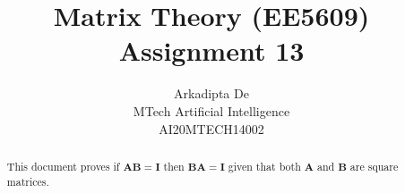 \documentclass[journal,12pt,twocolumn]{IEEEtran}
\DeclareMathOperator*{\Res}{Res}
\begin{document}
\providecommand{\abs}[1]{\left\vert#1\right\vert}
\providecommand{\res}[1]{\Res\displaylimits_{#1}} 
\providecommand{\norm}[1]{\left\lVert#1\right\rVert}
\providecommand{\mtx}[1]{\mathbf{#1}}
\providecommand{\mean}[1]{E\left[ #1 \right]}
\providecommand{\fourier}{\overset{\mathcal{F}}{ \rightleftharpoons}}
\providecommand{\system}{\overset{\mathcal{H}}{ \longleftrightarrow}}
\newcommand{\solution}{\noindent \textbf{Solution: }}
\newcommand{\cosec}{\,\text{cosec}\,}
\providecommand{\dec}[2]{\ensuremath{\overset{#1}{\underset{#2}{\gtrless}}}}
\newcommand{\myvec}[1]{\ensuremath{\begin{pmatrix}#1\end{pmatrix}}}
\newcommand{\mydet}[1]{\ensuremath{\begin{vmatrix}#1\end{vmatrix}}}
\makeatletter
{}
\makeatother
\let\StandardTheFigure\thefigure
\let\vec\mathbf
\renewcommand{\thefigure}{\theproblem}
\def\putbox#1#2#3{\makebox[0in][l]{\makebox[#1][l]{}\raisebox{\baselineskip}[0in][0in]{\raisebox{#2}[0in][0in]{#3}}}}
     \def\rightbox#1{\makebox[0in][r]{#1}}
     \def\centbox#1{\makebox[0in]{#1}}
     \def\topbox#1{\raisebox{-\baselineskip}[0in][0in]{#1}}
     \def\midbox#1{\raisebox{-0.5\baselineskip}[0in][0in]{#1}}
\vspace{3cm}
\title{Matrix Theory (EE5609) Assignment 13}
\author{Arkadipta De\\MTech Artificial Intelligence\\AI20MTECH14002}

\maketitle
\newpage
\bigskip
\renewcommand{\thefigure}{\theenumi}
\renewcommand{\thetable}{\theenumi}

\begin{abstract}
This document proves if $\vec{AB}=\vec{I}$ then $\vec{BA}=\vec{I}$ given that both $\vec{A}$ and $\vec{B}$ are square matrices.
\end{abstract}
\end{document}
